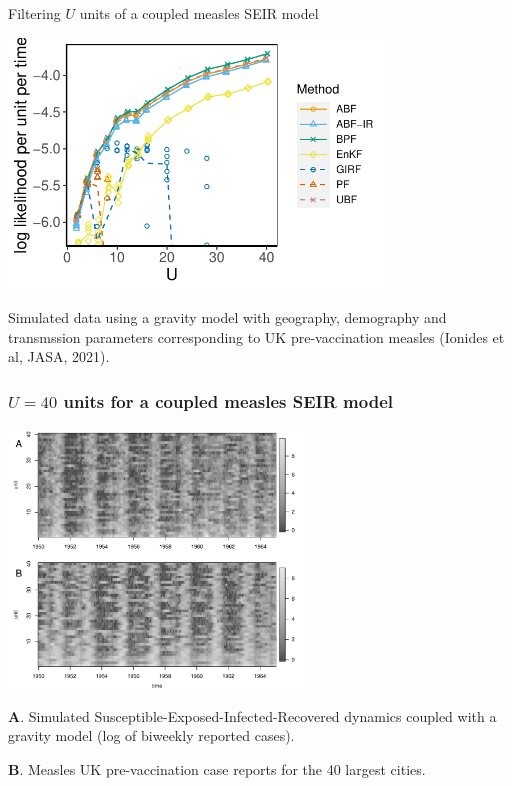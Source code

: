 \documentclass{beamer}
\begin{document}
\begin{frame}{Filtering $U$ units of a coupled measles SEIR model}

\vspace{-3mm}

\begin{center}
\includegraphics[width=10cm]{mscale_loglik_plot-1.pdf}


\end{center}

\vspace{-2mm}

Simulated data using a gravity model with geography, demography and transmssion parameters corresponding to UK pre-vaccination measles (Ionides et al, {JASA}, 2021).


\end{frame}

\begin{frame}
\frametitle{$U=40$ units for a coupled measles SEIR model}

\vspace{-2.7mm}

\begin{center}
\includegraphics[width=8cm]{slice_image_plot-1.pdf}
\end{center}

\vspace{-3mm}

{\bf A}. Simulated Susceptible-Exposed-Infected-Recovered dynamics coupled with a gravity model (log of biweekly reported cases).

{\bf B}. Measles UK pre-vaccination case reports for the 40 largest cities.





\end{frame}
\end{document}
